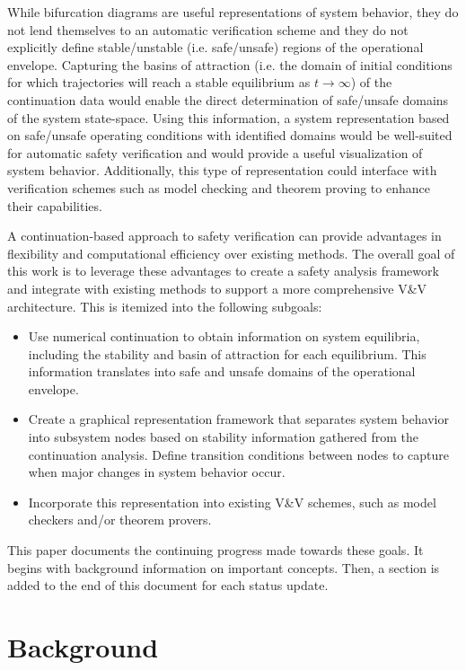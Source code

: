 \documentclass[12pt]{article}
\begin{document}
While bifurcation diagrams are useful representations of system behavior, they do not lend themselves to an automatic verification scheme and they do not explicitly define stable/unstable (i.e. safe/unsafe) regions of the operational envelope. Capturing the basins of attraction (i.e. the domain of initial conditions for which trajectories will reach a stable equilibrium as $t \to \infty$) of the continuation data would enable the direct determination of safe/unsafe domains of the system state-space. Using this information, a system representation based on safe/unsafe operating conditions with identified domains would be well-suited for automatic safety verification and would provide a useful visualization of system behavior. Additionally, this type of representation could interface with verification schemes such as model checking and theorem proving to enhance their capabilities. 

A continuation-based approach to safety verification can provide advantages in flexibility and computational efficiency over existing methods. The overall goal of this work is to leverage these advantages to create a safety analysis framework and integrate with existing methods to support a more comprehensive V\&V architecture. This is itemized into the following subgoals:

\begin{itemize}
\item Use numerical continuation to obtain information on system equilibria, including the stability and basin of attraction for each equilibrium. This information translates into safe and unsafe domains of the operational envelope.
\item Create a graphical representation framework that separates system behavior into subsystem nodes based on stability information gathered from the continuation analysis. Define transition conditions between nodes to capture when major changes in system behavior occur.
\item Incorporate this representation into existing V\&V schemes, such as model checkers and/or theorem provers. 
\end{itemize}

This paper documents the continuing progress made towards these goals. It begins with background information on important concepts. Then, a section is added to the end of this document for each status update.


\section{Background}
\end{document}
